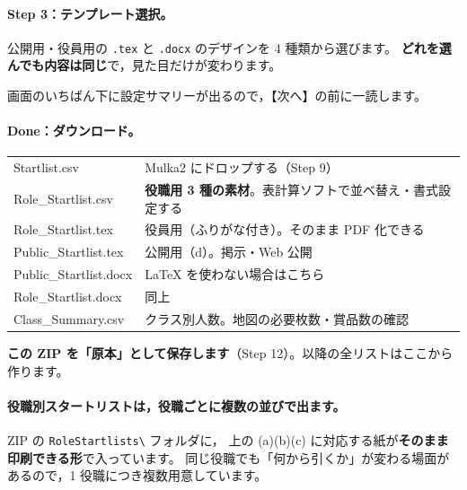 \begin{J2M}
\paragraph{Step 3：テンプレート選択。}
公開用・役員用の \texttt{.tex} と \texttt{.docx} のデザインを 4 種類から選びます。
\textbf{どれを選んでも内容は同じ}で，見た目だけが変わります。


画面のいちばん下に設定サマリーが出るので，【次へ】の前に一読します。

\paragraph{Done：ダウンロード。}


\begin{center}
\small
\begin{tabular}{@{}>{\ttfamily}P{40mm}P{88mm}@{}}
\toprule
\rmfamily{} &  \\
\midrule
Startlist.csv & Mulka2 にドロップする（Step 9） \\
Role\_Startlist.csv & \textbf{役職用 3 種の素材}。表計算ソフトで並べ替え・書式設定する \\
Role\_Startlist.tex & 役員用（ふりがな付き）。そのまま PDF 化できる \\
Public\_Startlist.tex & 公開用（d）。掲示・Web 公開 \\
Public\_Startlist.docx & LaTeX を使わない場合はこちら \\
Role\_Startlist.docx & 同上 \\
Class\_Summary.csv & クラス別人数。地図の必要枚数・賞品数の確認 \\
\bottomrule
\end{tabular}
\end{center}

\textbf{この ZIP を「原本」として保存します}（Step 12）。以降の全リストはここから作ります。

\paragraph{役職別スタートリストは，役職ごとに複数の並びで出ます。}
ZIP の \texttt{RoleStartlists\textbackslash{}} フォルダに，
上の (a)(b)(c) に対応する紙が\textbf{そのまま印刷できる形}で入っています。
同じ役職でも「何から引くか」が変わる場面があるので，1 役職につき複数用意しています。


\end{J2M}
